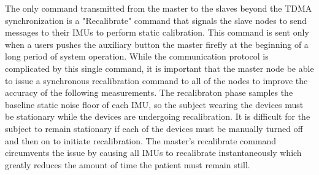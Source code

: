 \documentclass[conference]{IEEEtran}
\begin{document}
  The only command transmitted from the master to the slaves beyond the TDMA synchronization
is a "Recalibrate" command that signals the slave nodes to send messages to their IMUs to
perform static calibration. This command is sent only when a users pushes the auxiliary
button the master firefly at the beginning of a long period of system operation. While the
communication protocol is complicated by this single command, it is important that the
master node be able to issue a synchronous recalibration command to all of the nodes to
improve the accuracy of the following measurements. The recalibraton phase samples the
baseline static noise floor of each IMU, so the subject wearing the devices must be
stationary while the devices are undergoing recalibration. It is difficult for the subject
to remain stationary if each of the devices must be manually turned off and then on to initiate
recalibration. The master's recalibrate command circumvents the issue by causing all IMUs
to recalibrate instantaneously which greatly reduces the amount of time the patient must
remain still. 
\end{document}
